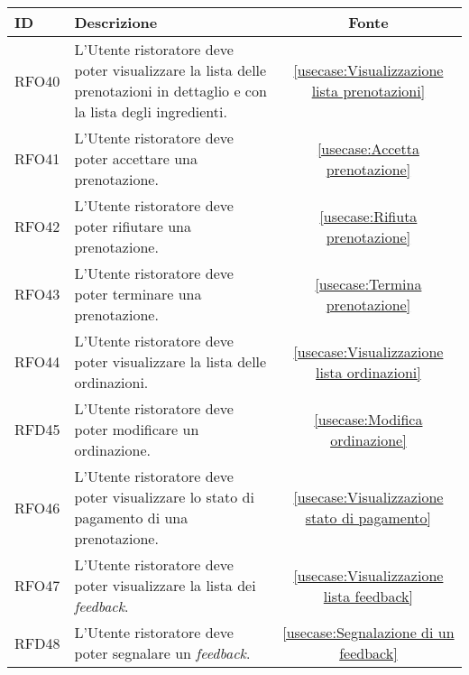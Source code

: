 \begin{table}[H]
	\renewcommand{\arraystretch}{1.5}
	\centering
	\begin{tabularx}{\textwidth}{l|X|c}
		\textbf{ID} & \textbf{Descrizione}                                                                                                    & \textbf{Fonte}                                       \\
		\hline
		RFO40       & L'Utente ristoratore deve poter visualizzare la lista delle prenotazioni in dettaglio e con la lista degli ingredienti. & \autoref{usecase:Visualizzazione lista prenotazioni} \\
		\hline
		RFO41       & L'Utente ristoratore deve poter accettare una prenotazione.                                                             & \autoref{usecase:Accetta prenotazione}               \\
		\hline
		RFO42       & L'Utente ristoratore deve poter rifiutare una prenotazione.                                                             & \autoref{usecase:Rifiuta prenotazione}               \\
		\hline
		RFO43       & L'Utente ristoratore deve poter terminare una prenotazione.                                                             & \autoref{usecase:Termina prenotazione}               \\
		\hline
		RFO44       & L'Utente ristoratore deve poter visualizzare la lista delle ordinazioni.                                                & \autoref{usecase:Visualizzazione lista ordinazioni}  \\
		\hline
		RFD45       & L'Utente ristoratore deve poter modificare un ordinazione.                                                              & \autoref{usecase:Modifica ordinazione}               \\
		\hline
		RFO46       & L'Utente ristoratore deve poter visualizzare lo stato di pagamento di una prenotazione.                                 & \autoref{usecase:Visualizzazione stato di pagamento} \\
		\hline
		RFO47       & L'Utente ristoratore deve poter visualizzare la lista dei \textit{feedback}.                                                     & \autoref{usecase:Visualizzazione lista feedback}     \\
		\hline
		RFD48       & L'Utente ristoratore deve poter segnalare un \textit{feedback}.                                                                  & \autoref{usecase:Segnalazione di un feedback}        \\

\end{tabularx}
\end{table}
